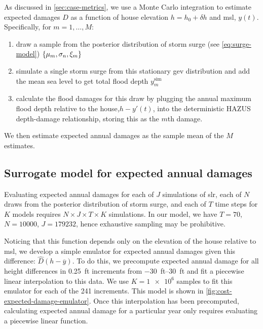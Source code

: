 \documentclass[ef,draft]{agutexSI2019}
\begin{document}
\begin{article}
      As discussed in \cref{sec:case-metrics}, we use a Monte Carlo integration to estimate expected damages $D$ as a function of house elevation $h = h_0 + \delta h$ and \gls{msl}, $y(t)$.
      Specifically, for $m=1, \ldots, M$:
      \begin{enumerate}
            \item draw a sample from the posterior distribution of storm surge (see \cref{eq:surge-model})  $\qty{ \mu_m, \sigma_n, \xi_m}$
            \item simulate a single storm surge from this stationary \gls{gev} distribution and add the mean sea level to get total flood depth $y^\mathrm{sim}_m$
            \item calculate the flood damages for this draw by plugging the annual maximum flood depth relative to the house,$h - y'(t)$, into  the deterministic HAZUS depth-damage relationship, storing this as the $m$th damage.
      \end{enumerate}
      We then estimate expected annual damages as the sample mean of the $M$ estimates.

      \subsection{Surrogate model for expected annual damages}\label{sec:surrogate-ead}
      Evaluating expected annual damages for each of $J$ simulations of \gls{slr}, each of $N$ draws from the posterior distribution of storm surge, and each of $T$ time steps for $K$ models requires $N \times J \times T \times K$ simulations.
      In our model, we have $T=70$, $N=\num{10000}$, $J=\num{179232}$, hence exhaustive sampling may be prohibitive.

      Noticing that this function depends only on the elevation of the house relative to \gls{msl}, we develop a simple emulator for expected annual damages given this difference: $\hat{D}(h - \overline{y})$.
      To do this, we  precompute expected annual damage for all height differences in \SI{0.25}{ft} increments from \SIrange{-30}{30}{ft} and fit a piecewise linear interpolation to this data.
      We use $K=\num{1e6}$ samples to fit this emulator for each of the 241 increments.
      This model is shown in \cref{fig:cost-expected-damage-emulator}.
      Once this interpolation has been precomputed, calculating expected annual damage for a particular year only requires evaluating a piecewise linear function.




\end{article}
\end{document}
